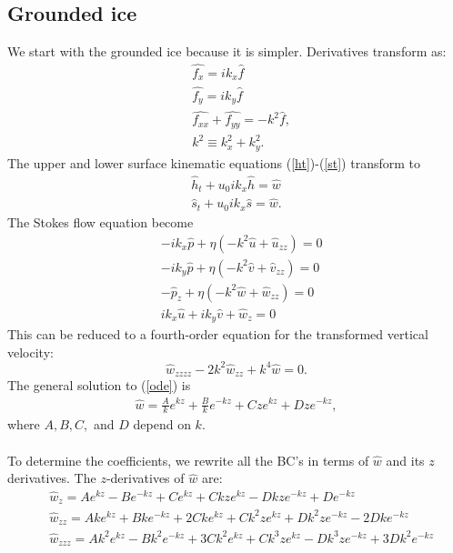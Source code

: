 \documentclass[paper=a4, fontsize=11pt]{article}
\begin{document}
\subsection*{Grounded ice}
We start with the grounded ice because it is simpler.
Derivatives transform as:
\begin{align}
&\hat{f_x} = ik_x\hat{f} \\
&\hat{f_y} = ik_y\hat{f} \\
&\hat{f_{xx}} + \hat{f_{yy}} = -k^2 \hat{f}, \\ &k^2 \equiv k_x^2 + k_y^2.
\end{align}
The upper and lower surface kinematic equations (\ref{ht})-(\ref{st}) transform to
\begin{align}
\hat{h}_t + u_0 ik_x \hat{h} = \hat{w}\label{hthat}\\
\hat{s}_t + u_0 ik_x \hat{s} = \hat{w}.\label{sthat}
\end{align}
The Stokes flow equation become
\begin{align}
&-ik_x\hat{p} + \eta ( -k^2\hat{u} + \hat{u}_{zz}) = 0 \\
&-ik_y\hat{p} + \eta ( -k^2\hat{v} + \hat{v}_{zz}) = 0 \\
&-\hat{p}_z + \eta (-k^2\hat{w} + \hat{w}_{zz}) = 0 \\
&ik_x\hat{u} + ik_y\hat{v} + \hat{w}_z = 0
\end{align}
This can be reduced to a fourth-order equation for the transformed vertical velocity:
\begin{equation}
\hat{w}_{zzzz} - 2k^2 \hat{w}_{zz} + k^4 \hat{w}=0. \label{ode}
\end{equation}
The general solution to (\ref{ode}) is
\begin{align}
\hat{w} = \frac{A}{k}e^{k z} + \frac{B}{k}e^{-k z} + {C}ze^{k z}+ {D}ze^{-k z},
\end{align}
where $A,B,C,$ and $D$ depend on $k$.\\ \\
To determine the coefficients, we rewrite all the BC's in terms of $\hat{w}$ and its $z$ derivatives.
The $z$-derivatives of $\hat{w}$ are:
\begin{align}
&\hat{w}_{z} = {A}e^{k z} - {B}e^{-k z} + {C}e^{k z} + {C}kze^{k z} - {D}kze^{-k z} + {D}e^{-k z} \\
&\hat{w}_{zz} = {Ak}e^{k z} + {Bk}e^{-k z} + {2Ck}e^{k z} + {C}k^2 ze^{k z} + {D}k^2ze^{-k z} - {2Dk}e^{-k z} \\
&\hat{w}_{zzz} = {Ak^2}e^{k z} - {Bk^2}e^{-k z} + {3Ck^2}e^{k z} + {C}k^3 ze^{k z} - {D}k^3ze^{-k z} + {3Dk^2}e^{-k z}
\end{align}
\end{document}
